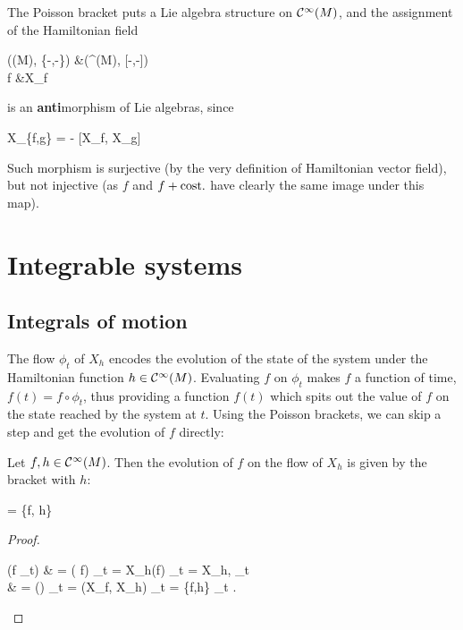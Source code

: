 \documentclass[main.tex]{subfiles}
\begin{document}
\begin{corollary}
	The Poisson bracket puts a Lie algebra structure on $\mathcal{C}^\infty(M)$, and the assignment of the Hamiltonian field
	\begin{eqalign}
		(\Cinfty(M), \{-,-\}) &\longto (\fields^{}(M), [-,-])\\
		f &\longmapsto X_f
	\end{eqalign}
	is an \textbf{anti}morphism of Lie algebras, since
	\begin{eqalign}
	\label{eq:Lie_alg_struct_Ham_fields}
		X_{\{f,g\}} = - [X_f, X_g]
	\end{eqalign}
	Such morphism is surjective (by the very definition of Hamiltonian vector field), but not injective (as $f$ and $f+\text{cost.}$ have clearly the same image under this map).
\end{corollary}

\chapter{Integrable systems}
\section{Integrals of motion}
The flow $\phi_t$ of $X_h$ encodes the evolution of the state of the system under the Hamiltonian function $h \in \mathcal{C}^\infty(M)$. Evaluating $f$ on $\phi_t$ makes $f$ a function of time, $f(t) = f \circ \phi_t$, thus providing a function $f(t)$ which spits out the value of $f$ on the state reached by the system at $t$. Using the Poisson brackets, we can skip a step and get the evolution of $f$ directly:

\begin{theorem}
	Let $f, h \in \mathcal{C}^\infty(M)$. Then the evolution of $f$ on the flow of $X_h$ is given by the bracket with $h$:
	\begin{eqalign}
	\label{eq:evolution_f_flow_Xh}
		 = \{f, h\}
	\end{eqalign}
\end{theorem}
\begin{proof}
	\begin{eqalign}
		 (f \circ \phi_t) & = ( f) \circ \phi_t = X_h(f) \circ \phi_t = \langle X_h, \omega \rangle \circ \phi_t\\
		& = (\omega) \circ \phi_t = \omega(X_f, X_h) \circ \phi_t = \{f,h\} \circ \phi_t .
	\end{eqalign}
\end{proof}
\end{document}
